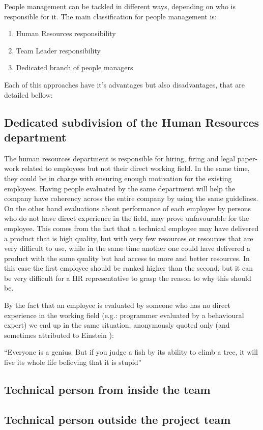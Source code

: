 People management can be tackled in different ways, depending on who is responsible for it. The main classification for people management is:
\begin{enumerate}
\item Human Resources responsibility
\item Team Leader responsibility 
\item Dedicated branch of people managers
\end{enumerate}

Each of this approaches have it's advantages but also disadvantages, that are detailed bellow:
\subsection{Dedicated subdivision of the Human Resources department}
\label{subsec:hrdep}

The human resources department is responsible for hiring, firing and legal paper-work related to employees but not their direct working field. In the same time, they could be in charge with ensuring enough motivation for the existing employees. Having people evaluated by the same department will help the company have coherency across the entire company by using the same guidelines. On the other hand evaluations about performance of each employee by persons who do not have direct experience in the field, may prove unfavourable for the employee. This comes from the fact that a technical employee may have delivered a product that is high quality, but with very few resources or resources that are very difficult to use, while in the same time another one could have delivered a product with the same quality but had access to more and better resources. In this case the first employee should be ranked higher than the second, but it can be very difficult for a HR representative to grasp the reason to why this should be. 

By the fact that an employee is evaluated by someone who has no direct experience in the working field (e.g.: programmer evaluated by a behavioural expert) we end up in the same situation, anonymously quoted only (and sometimes attributed to Einstein \cite{aeq}): 
\begin{displayquote}
``Everyone is a genius. But if you judge a fish by its ability to climb a tree, it will live its whole life believing that it is stupid''
\end{displayquote}

\subsection{Technical person from inside the team}
\label{subsec:techin}

 \newline

\subsection{Technical person outside the project team}
\label{subsec:techout}

 \newline
